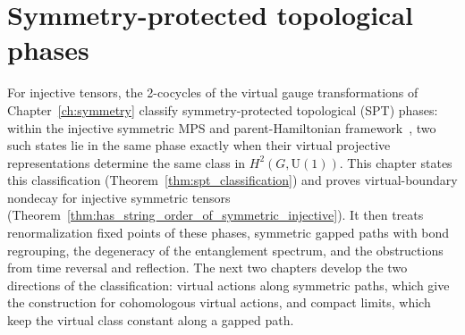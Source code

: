
\chapter{Symmetry-protected topological phases}\label{ch:symmetry_spt}

For injective tensors, the 2-cocycles of the virtual gauge transformations of
Chapter~\ref{ch:symmetry} classify symmetry-protected topological (SPT)
phases: within the injective symmetric MPS and parent-Hamiltonian
framework~\cite{Schuch2011Phases}, two such states lie in the same phase
exactly when their virtual projective representations determine the same class
in $H^2(G,\mathrm{U}(1))$. This chapter states this classification
(Theorem~\ref{thm:spt_classification}) and proves virtual-boundary nondecay
for injective symmetric tensors
(Theorem~\ref{thm:has_string_order_of_symmetric_injective}). It then treats
renormalization fixed points of these phases, symmetric gapped paths with bond
regrouping, the degeneracy of the entanglement spectrum, and the obstructions
from time reversal and reflection. The next two chapters develop the two
directions of the classification: virtual actions along symmetric paths, which
give the construction for cohomologous virtual actions, and compact limits,
which keep the virtual class constant along a gapped path.


